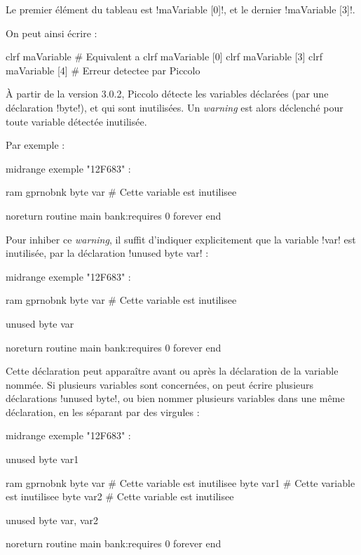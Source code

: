Le premier élément du tableau est \pic!maVariable [0]!, et le dernier  \pic!maVariable [3]!.

On peut ainsi écrire :
\begin{piccolo}
  clrf maVariable # Equivalent a clrf maVariable [0]
  clrf maVariable [3]
  clrf maVariable [4] # Erreur detectee par Piccolo
\end{piccolo}












À partir de la version 3.0.2, Piccolo détecte les variables déclarées (par une déclaration \pic!byte!), et qui sont inutilisées. Un \emph{warning} est alors déclenché pour toute variable détectée inutilisée.

Par exemple :

\begin{piccolo}
midrange exemple "12F683" :

ram gprnobnk {
  byte var # Cette variable est inutilisee
}

noreturn routine main bank:requires 0 {
  forever
  end
}
\end{piccolo}


Pour inhiber ce \emph{warning}, il suffit d'indiquer explicitement que la variable \pic!var! est inutilisée, par la déclaration \pic!unused byte var! :

\begin{piccolo}
midrange exemple "12F683" :

ram gprnobnk {
  byte var # Cette variable est inutilisee
}

unused byte var

noreturn routine main bank:requires 0 {
  forever
  end
}
\end{piccolo}

Cette déclaration peut apparaître avant ou après la déclaration de la variable nommée. Si plusieurs variables sont concernées, on peut écrire plusieurs déclarations \pic!unused byte!, ou bien nommer plusieurs variables dans une même déclaration, en les séparant par des virgules :

\begin{piccolo}
midrange exemple "12F683" :

unused byte var1

ram gprnobnk {
  byte var # Cette variable est inutilisee
  byte var1 # Cette variable est inutilisee
  byte var2 # Cette variable est inutilisee
}

unused byte var, var2

noreturn routine main bank:requires 0 {
  forever
  end
}
\end{piccolo}



